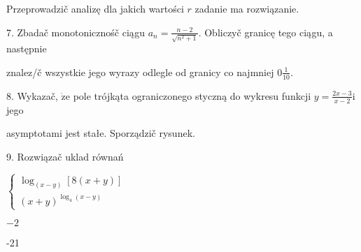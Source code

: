 \documentclass[a4paper,12pt]{article}
\begin{document}
Przeprowadzič analizę dla jakich wartości $r$ zadanie ma rozwiązanie.

7. Zbadač monotonicznośč ciągu $a_{n} = \displaystyle \frac{n-2}{\sqrt{n^{2}+1}}$. Obliczyč granicę tego ciągu, a następnie

znalez/č wszystkie jego wyrazy odlegle od granicy co najmniej $0\displaystyle \frac{1}{10}.$

8. Wykazač, $\dot{\mathrm{z}}\mathrm{e}$ pole trójkąta ograniczonego styczną do wykresu funkcji $y = \displaystyle \frac{2x-3}{x-2} \mathrm{i}$ jego

asymptotami jest stałe. Sporządzič rysunek.

9. Rozwiązač uklad równań

$\left\{\begin{array}{l}
\log_{(x-y)}[8(x+y)]\\
(x+y)^{\log_{4}(x-y)}
\end{array}\right.$

$-2$

-21
\end{document}
